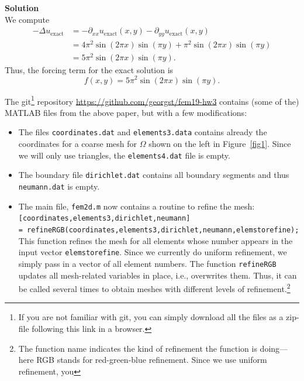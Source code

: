 \documentclass[11pt]{article}
\begin{document}
\begin{enumerate}

{\bf Solution}\\
We compute
\begin{align*}
-\Delta u_{\text{exact}} &= -\partial_{xx}u_{\text{exact}}(x,y) - \partial_{yy}u_{\text{exact}}(x,y)\\
&= 4\pi^2 \sin(2\pi x)\sin(\pi y) + \pi^2 \sin(2\pi x)\sin( \pi y)\\
&= 5\pi^2 \sin(2\pi x)\sin( \pi y).
\end{align*}
Thus, the forcing term for the exact solution is
\[
f(x,y) =  5\pi^2 \sin(2\pi x)\sin( \pi y).
\]


  The git\footnote{If you are not familiar with git, you can simply
    download all the files as a zip-file following this link in a
    browser.} repository \url{https://github.com/georgst/fem19-hw3}
  contains (some of the) MATLAB files from the above paper, but with a
  few modifications:
  \begin{itemize}
  \item The files \texttt{coordinates.dat} and \texttt{elements3.data}
    contains already the coordinates for a coarse mesh for $\Omega$
    shown on the left in Figure~\ref{fig1}. Since we will only use
    triangles, the \texttt{elements4.dat} file is empty.
  \item The boundary file \texttt{dirichlet.dat} contains all
    boundary segments and thus \texttt{neumann.dat} is empty.
  \item The main file, \texttt{fem2d.m} now contains a routine to
    refine the mesh:\\[1ex]
    \texttt{[coordinates,elements3,dirichlet,neumann]\\ \qquad =
      refineRGB(coordinates,elements3,dirichlet,neumann,elemstorefine);}\\[1ex]
    This function refines the mesh for all elements whose number
    appears in the input vector \texttt{elemstorefine}. Since we
    currently do uniform refinement, we simply pass in a vector of all
    element numbers. The function \texttt{refineRGB} updates all
    mesh-related variables in place, i.e., overwrites them. Thus, it
    can be called several times to obtain meshes with different levels
    of refinement.\footnote{The function name indicates the kind of
      refinement the function is doing---here RGB stands for
      red-green-blue refinement. Since we use uniform refinement, you
}
\end{itemize}
\end{enumerate}
\end{document}
